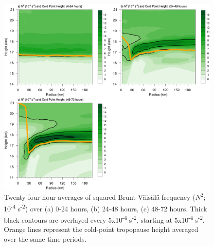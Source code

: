 \documentclass{ametsoc}
\begin{document}
\begin{figure}[ht]
\centerline{\includegraphics[width=39pc]{n2-24hr-avgs.png}}
\caption{Twenty-four-hour averages of squared Brunt-V{\"a}is{\"a}l{\"a} frequency ($N^2$; 10\textsuperscript{-4} s\textsuperscript{-2}) over (a) 0-24 hours, (b) 24-48 hours, (c) 48-72 hours. Thick black contours are overlayed every 5x10\textsuperscript{-4} s\textsuperscript{-2}, starting at 5x10\textsuperscript{-4} s\textsuperscript{-2}.
Orange lines represent the cold-point tropopause height averaged over the same time periods.}
\label{fig:n2-24hr-avgs}
\end{figure}
\end{document}
